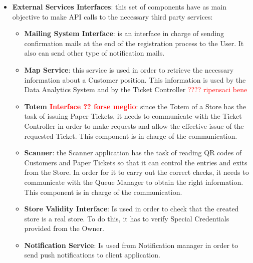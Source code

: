 \documentclass[a4paper, 12pt, oneside, table]{article}
\newcommand{\yasmin}[1]{\textcolor{Red}{#1}}
\begin{document}
\begin{itemize}
\begin{itemize}
    \end{itemize}
    \item \textbf{External Services Interfaces}: this set of components have as main objective to make API calls to the necessary third party services:
    \begin{itemize}
        \item \textbf{Mailing System Interface}: is an interface in charge of sending confirmation mails at the end of the registration process to the User. It also can send other type of notification mails.
        \item \textbf{Map Service}: this service is used in order to retrieve the necessary information about a Customer position. This information is used by the Data Analytics System and by the Ticket Controller \yasmin{???? ripensaci bene}
        \item \textbf{Totem \yasmin{Interface ?? forse meglio}}: since the Totem of a Store has the task of issuing Paper Tickets, it needs to communicate with the Ticket Controller in order to make requests and allow the effective issue of the requested Ticket. This component is in charge of the communication.
        \item \textbf{Scanner}: the Scanner application has the task of reading QR codes of Customers and Paper Tickets so that it can control the entries and exits from the Store. In order for it to carry out the correct checks, it needs to communicate with the Queue Manager to obtain the right information. This component is in charge of the communication.
        \item \textbf{Store Validity Interface}: Is used in order to check that the created store is a real store. To do this, it has to verify Special Credentials provided from the Owner.
        
        \item \textbf{Notification Service}: Is used from Notification manager in order to send push notifications to client application.
    \end{itemize}
    
\end{itemize}
\end{document}
